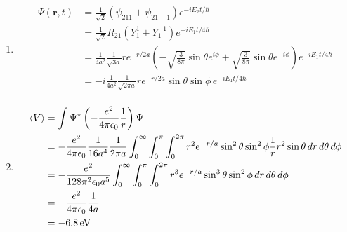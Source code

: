 \documentclass{article}
\renewcommand{\vec}[1]{\boldsymbol{\mathbf{#1}}}
\begin{document}
\begin{enumerate}
  \item

        \begin{align*}
          \Psi(\vec{r}, t) & = \frac{1}{\sqrt{2}} (\psi_{211} + \psi_{21-1}) e^{-i E_2 t / \hbar}                                                                                                                        \\
                           & = \frac{1}{\sqrt{2}} R_{21} (Y_1^1 + Y_1^{-1}) e^{-i E_1 t / 4 \hbar}                                                                                                                       \\
                           & = \frac{1}{4 a^2} \frac{1}{\sqrt{3 a}} r e^{-r / 2 a} \left( -\sqrt{\frac{3}{8 \pi}} \sin \theta e^{i \phi} + \sqrt{\frac{3}{8 \pi}} \sin \theta e^{-i \phi} \right) e^{-i E_1 t / 4 \hbar} \\
                           & = -i \frac{1}{4 a^2} \frac{1}{\sqrt{2 \pi a}} r e^{-r / 2 a} \sin \theta \sin \phi \,e^{-i E_1 t / 4 \hbar}                                                                                 \\
        \end{align*}

  \item

        \begin{align*}
          \braket{V} & = \int \Psi^* \left( -\frac{e^2}{4 \pi \epsilon_0} \frac{1}{r} \right) \Psi                                                                                                                               \\
                     & = -\frac{e^2}{4 \pi \epsilon_0} \frac{1}{16 a^4} \frac{1}{2 \pi a} \int_0^\infty \int_0^\pi \int_0^{2 \pi} r^2 e^{-r / a} \sin^2 \theta \sin^2 \phi \frac{1}{r} r^2 \sin \theta \,d r \,d \theta \,d \phi \\
                     & = -\frac{e^2}{128 \pi^2 \epsilon_0 a^5} \int_0^\infty \int_0^\pi \int_0^{2 \pi} r^3 e^{-r / a} \sin^3 \theta \sin^2 \phi \,d r \,d \theta \,d \phi                                                        \\
                     & = -\frac{e^2}{4 \pi \epsilon_0} \frac{1}{4 a}                                                                                                                                                             \\
                     & = \qty{-6.8}{eV}
        \end{align*}
\end{enumerate}
\end{document}
